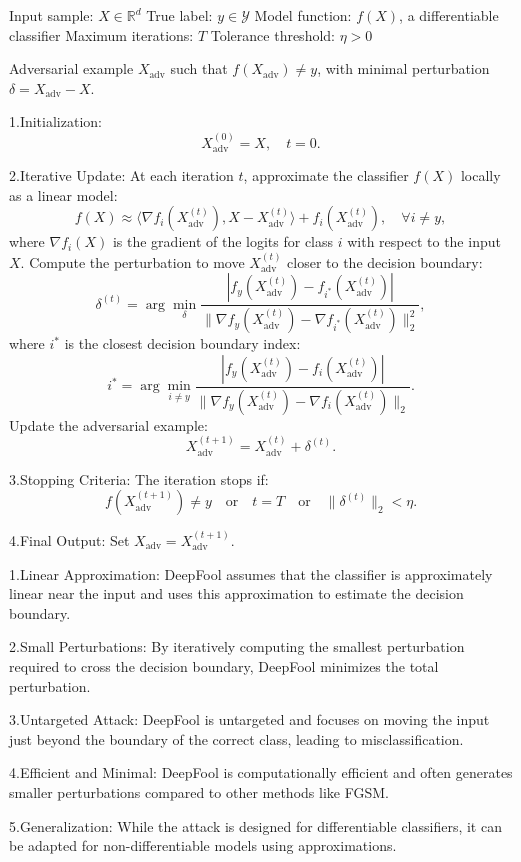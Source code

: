 Input sample: $X \in \mathbb{R}^d$
True label: $y \in \mathcal{Y}$
Model function: $f(X)$, a differentiable classifier
Maximum iterations: $T$
Tolerance threshold: $\eta > 0$

Adversarial example $X_{\text{adv}}$ such that $f(X_{\text{adv}}) \neq y$, with minimal perturbation $\delta = X_{\text{adv}} - X$.

1.Initialization:
   \[
   X^{(0)}_{\text{adv}} = X, \quad t = 0.
   \]

2.Iterative Update:
At each iteration $t$, approximate the classifier $f(X)$ locally as a linear model:
   \[
   f(X) \approx \langle \nabla f_i(X^{(t)}_{\text{adv}}), X - X^{(t)}_{\text{adv}} \rangle + f_i(X^{(t)}_{\text{adv}}), \quad \forall i \neq y,
   \]
where $\nabla f_i(X)$ is the gradient of the logits for class $i$ with respect to the input $X$.
Compute the perturbation to move $X^{(t)}_{\text{adv}}$ closer to the decision boundary:
   \[
   \delta^{(t)} = \arg\min_{\delta} \frac{|f_y(X^{(t)}_{\text{adv}}) - f_{i^*}(X^{(t)}_{\text{adv}})|}{\|\nabla f_y(X^{(t)}_{\text{adv}}) - \nabla f_{i^*}(X^{(t)}_{\text{adv}})\|_2^2},
   \]
where $i^*$ is the closest decision boundary index:
   \[
   i^* = \arg\min_{i \neq y} \frac{|f_y(X^{(t)}_{\text{adv}}) - f_i(X^{(t)}_{\text{adv}})|}{\|\nabla f_y(X^{(t)}_{\text{adv}}) - \nabla f_i(X^{(t)}_{\text{adv}})\|_2}.
   \]
Update the adversarial example:
   \[
   X^{(t+1)}_{\text{adv}} = X^{(t)}_{\text{adv}} + \delta^{(t)}.
   \]

3.Stopping Criteria:
   The iteration stops if:
   \[
   f(X^{(t+1)}_{\text{adv}}) \neq y \quad \text{or} \quad t = T \quad \text{or} \quad \|\delta^{(t)}\|_2 < \eta.
   \]

4.Final Output:
Set $X_{\text{adv}} = X^{(t+1)}_{\text{adv}}$.

1.Linear Approximation: DeepFool assumes that the classifier is approximately linear near the input and uses this approximation to estimate the decision boundary.

2.Small Perturbations: By iteratively computing the smallest perturbation required to cross the decision boundary, DeepFool minimizes the total perturbation.

3.Untargeted Attack: DeepFool is untargeted and focuses on moving the input just beyond the boundary of the correct class, leading to misclassification.

4.Efficient and Minimal: DeepFool is computationally efficient and often generates smaller perturbations compared to other methods like FGSM.

5.Generalization: While the attack is designed for differentiable classifiers, it can be adapted for non-differentiable models using approximations.

